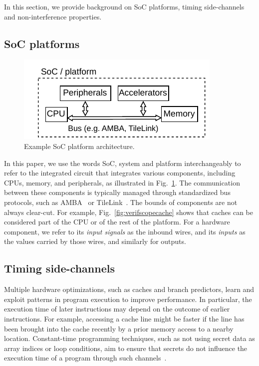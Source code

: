 In this section, we provide background on SoC platforms, timing side-channels and non-interference properties.

\subsection{SoC platforms}

\begin{figure}[t]
    \begin{center}
    \includegraphics[width=0.8\columnwidth]{figures/exampleplatform/exampleplatform.pdf}
    \end{center}
    \vspace*{-1em}
    \caption{\label{fig:exampleplatform}
        Example SoC platform architecture.
    }
    \vspace*{-1em}
\end{figure}

In this paper, we use the words SoC, system and platform interchangeably to refer to the integrated circuit that integrates various components, including CPUs, memory, and peripherals, as illustrated in Fig.~\ref{fig:exampleplatform}.
The communication between these components is typically managed through standardized bus protocols, such as AMBA~\cite{arm_amba} or TileLink~\cite{tilelink_spec}.
The bounds of components are not always clear-cut.
For example, Fig.~\ref{fig:verifscopecache} shows that caches can be considered part of the CPU or of the rest of the platform.
For a hardware component, we refer to its \emph{input signals} as the inbound wires, and its \emph{inputs} as the values carried by those wires, and similarly for outputs.

\subsection{Timing side-channels}

Multiple hardware optimizations, such as caches and branch predictors, learn and exploit patterns in program execution to improve performance.
In particular, the execution time of later instructions may depend on the outcome of earlier instructions.
For example, accessing a cache line might be faster if the line has been brought into the cache recently by a prior memory access to a nearby location.
Constant-time programming techniques, such as not using secret data as array indices or loop conditions, aim to ensure that secrets do not influence the execution time of a program through such channels~\cite{OsvikShamirTromer2006CacheAES,AlmeidaEtAl2016CTVerif}.

